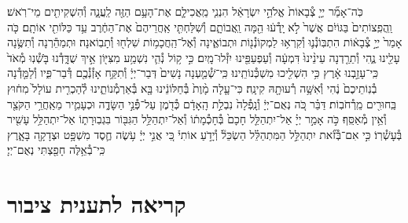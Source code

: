 \documentclass[twoside, openany, parskip=half, 11pt]{book}
\begin{document}
\begin{footnotesize}
\begin{multicols}{2}
כֹּֽה־אָמַ֞ר יְיָ֤ צְ֯בָאוֹת֙ אֱלֹהֵ֣י יִשְׂרָאֵ֔ל הִנְנִ֧י מַֽאֲכִילָ֛ם אֶת־הָעָ֥ם הַזֶּ֖ה לַֽעֲנָ֑ה וְ֯הִשְׁקִיתִ֖ים מֵי־רֹֽאשׁ׃ וַֽהֲפִֽצוֹתִים֙ בַּגּוֹיִ֔ם אֲשֶׁר֙ לֹ֣א יָֽדְ֯ע֔וּ הֵ֖מָּה וַֽאֲבוֹתָ֑ם וְ֯שִׁלַּחְתִּ֤י אַֽחֲרֵיהֶם֙ אֶת־הַחֶ֔רֶב עַ֥ד כַּלּוֹתִ֖י אוֹתָֽם׃ כֹּ֤ה אָמַר֙ יְיָ֣ צְ֯בָא֔וֹת הִתְבּֽוֹנְ֯נ֛וּ וְ֯קִרְא֥וּ לַמְקוֹנְ֯נ֖וֹת וּתְבוֹאֶ֑ינָה וְ֯אֶל־הַֽחֲכָמ֥וֹת שִׁלְח֖וּ וְ֯תָבֽוֹאנָה׃ וּתְמַהֵ֕רְנָה וְ֯תִשֶּׂ֥נָה עָלֵ֖ינוּ נֶ֑הִי וְ֯תֵרַ֤דְנָה עֵינֵ֨ינוּ֙ דִּמְעָ֔ה וְ֯עַפְעַפֵּ֖ינוּ יִזְּ֯לוּ־מָֽיִם׃ כִּ֣י ק֥וֹל נְ֯הִ֛י נִשְׁמַ֥ע מִצִּיּ֖וֹן אֵ֣יךְ שֻׁדָּ֑דְ֯נוּ בֹּ֤שְׁ֯נֽוּ מְ֯אֹד֙ כִּֽי־עָזַ֣בְנוּ אָ֔רֶץ כִּ֥י הִשְׁלִ֖יכוּ מִשְׁכְּ֯נוֹתֵֽינוּ׃ כִּֽי־שְׁ֯מַ֤עְנָה נָשִׁים֙ דְּבַר־יְיָ֔ וְ֯תִקַּ֥ח אָזְ֯נְ֯כֶ֖ם דְּ֯בַר־פִּ֑יו וְ֯לַמֵּ֤דְ֯נָה בְ֯נֽוֹתֵיכֶם֙ נֶ֔הִי וְ֯אִשָּׁ֥ה רְ֯עוּתָ֖הּ קִינָֽה׃ כִּי־עָ֤לָה מָ֨וֶת֙ בְּ֯חַלּוֹנֵ֔ינוּ בָּ֖א בְּ֯אַרְמְ֯נוֹתֵ֑ינוּ לְ֯הַכְרִ֤ית עוֹלָל֙ מִח֔וּץ בַּֽחוּרִ֖ים מֵֽרְ֯חֹבֽוֹת׃ דַּבֵּ֗ר כֹּ֚ה נְאֻם־יְיָ֔ וְ֯נָֽפְ֯לָה֙ נִבְלַ֣ת הָֽאָדָ֔ם כְּ֯דֹ֖מֶן עַל־פְּ֯נֵ֣י הַשָּׂדֶ֑ה וּכְעָמִ֛יר מֵאַֽחֲרֵ֥י הַקֹּצֵ֖ר וְ֯אֵ֥ין מְ֯אַסֵּֽף׃ כֹּ֣ה אָמַ֣ר יְיָ֗ אַל־יִתְהַלֵּ֤ל חָכָם֙ בְּ֯חָכְ֯מָת֔וֹ וְ֯אַל־יִתְהַלֵּ֥ל הַגִּבּ֖וֹר בִּגְבֽוּרָת֑וֹ אַל־יִתְהַלֵּ֥ל עָשִׁ֖יר בְּ֯עָשְׁ֯רֽוֹ׃ כִּ֣י אִם־בְּ֯זֹ֞את יִתְהַלֵּ֣ל הַמִּתְהַלֵּ֗ל הַשְׂכֵּל֘ וְ֯יָדֹ֣עַ אוֹתִי֒ כִּ֚י אֲנִ֣י יְיָ֔ עֹ֥שֶׂה חֶ֛סֶד מִשְׁפָּ֥ט וּצְדָקָ֖ה בָּאָ֑רֶץ כִּֽי־בְ֯אֵ֥לֶּה חָפַ֖צְתִּי נְאֻם־יְיָ׃

\end{multicols}

\section[תענית ציבור]{קריאה לתענית ציבור}\label{torah taanis tzibbur}



\end{footnotesize}
\end{document}
